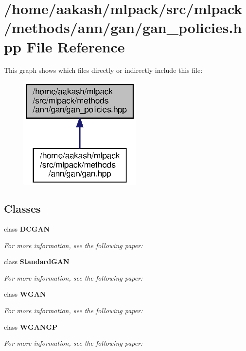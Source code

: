 \section{/home/aakash/mlpack/src/mlpack/methods/ann/gan/gan\+\_\+policies.hpp File Reference}
\label{gan__policies_8hpp}
This graph shows which files directly or indirectly include this file\+:
\nopagebreak
\begin{figure}[H]
\begin{center}
\leavevmode
\includegraphics[width=174pt]{gan__policies_8hpp__dep__incl}
\end{center}
\end{figure}
\subsection*{Classes}
\begin{DoxyCompactItemize}
\item 
class \textbf{ D\+C\+G\+AN}
\begin{DoxyCompactList}\small\item\em For more information, see the following paper\+: \end{DoxyCompactList}\item 
class \textbf{ Standard\+G\+AN}
\begin{DoxyCompactList}\small\item\em For more information, see the following paper\+: \end{DoxyCompactList}\item 
class \textbf{ W\+G\+AN}
\begin{DoxyCompactList}\small\item\em For more information, see the following paper\+: \end{DoxyCompactList}\item 
class \textbf{ W\+G\+A\+N\+GP}
\begin{DoxyCompactList}\small\item\em For more information, see the following paper\+: \end{DoxyCompactList}\end{DoxyCompactItemize}
